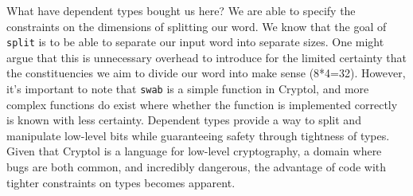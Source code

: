What have dependent types bought us here? We are able to specify the constraints
on the dimensions of splitting our word. We know that the goal of
\texttt{split} is to be able to separate our input word into separate sizes. One
might argue that this is unnecessary overhead to introduce for the limited
certainty that the constituencies we aim to divide our word into make sense
(8*4=32). However, it's important to note that \texttt{swab} is a simple
function in Cryptol, and more complex functions do exist where whether the
function is implemented correctly is known with less certainty. Dependent types
provide a way to split and manipulate low-level bits while guaranteeing safety
through tightness of types. Given that Cryptol is a language for low-level
cryptography, a domain where bugs are both common, and incredibly dangerous, the
advantage of code with tighter constraints on types becomes apparent. 